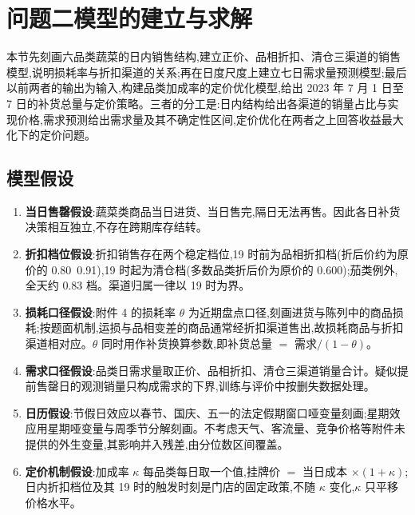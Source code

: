 \section{问题二模型的建立与求解}

本节先刻画六品类蔬菜的日内销售结构,建立正价、品相折扣、清仓三渠道的销售模型,说明损耗率与折扣渠道的关系;再在日度尺度上建立七日需求量预测模型;最后以前两者的输出为输入,构建品类加成率的定价优化模型,给出 2023 年 7 月 1 日至 7 日的补货总量与定价策略。三者的分工是:日内结构给出各渠道的销量占比与实现价格,需求预测给出需求量及其不确定性区间,定价优化在两者之上回答收益最大化下的定价问题。

\subsection{模型假设}

\begin{enumerate}
  \item \textbf{当日售罄假设}:蔬菜类商品当日进货、当日售完,隔日无法再售。因此各日补货决策相互独立,不存在跨期库存结转。
  \item \textbf{折扣档位假设}:折扣销售存在两个稳定档位,19 时前为品相折扣档(折后价约为原价的 0.80~0.91),19 时起为清仓档(多数品类折后价为原价的 0.600);茄类例外,全天约 0.83 档。渠道归属一律以 19 时为界。
  \item \textbf{损耗口径假设}:附件 4 的损耗率 $\theta$ 为近期盘点口径,刻画进货与陈列中的商品损耗;按题面机制,运损与品相变差的商品通常经折扣渠道售出,故损耗商品与折扣渠道相对应。$\theta$ 同时用作补货换算参数,即补货总量 $=$ 需求$/ (1-\theta)$。
  \item \textbf{需求口径假设}:品类日需求量取正价、品相折扣、清仓三渠道销量合计。疑似提前售罄日的观测销量只构成需求的下界,训练与评价中按删失数据处理。
  \item \textbf{日历假设}:节假日效应以春节、国庆、五一的法定假期窗口哑变量刻画;星期效应用星期哑变量与周季节分解刻画。不考虑天气、客流量、竞争价格等附件未提供的外生变量,其影响并入残差,由分位数区间覆盖。
  \item \textbf{定价机制假设}:加成率 $\kappa$ 每品类每日取一个值,挂牌价 $=$ 当日成本 $\times (1+\kappa)$;日内折扣档位及其 19 时的触发时刻是门店的固定政策,不随 $\kappa$ 变化,$\kappa$ 只平移价格水平。
\end{enumerate}

